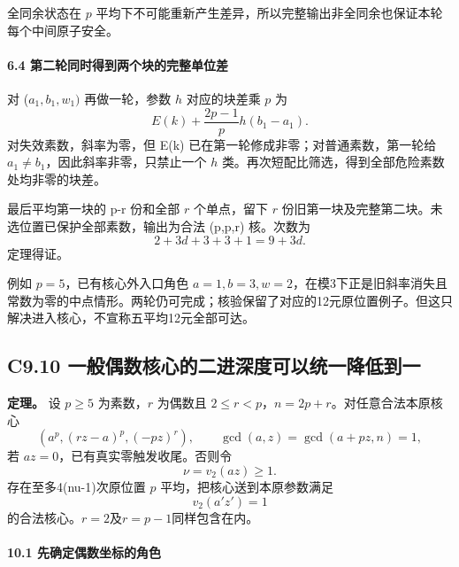 \documentclass[11pt,a4paper]{article}
\theoremstyle{definition}
\numberwithin{equation}{section}
\begin{document}
{全同余状态在} {\ensuremath{p}} {平均下不可能重新产生差异，所以完整输出非全同余也保证本轮每个中间原子安全。}

\paragraph*{\texorpdfstring{{6.4} {第二轮同时得到两个块的完整单位差}}{6.4 第二轮同时得到两个块的完整单位差}}\label{C9-h69}

{对} {(\ensuremath{a_{1},b_{1},w_{1})}} {再做一轮，参数} {\ensuremath{h}} {对应的块差乘} {\ensuremath{p}} {为} \[
E(k)+\frac{2p-1}{p}h(b_1-a_1).
\tag{C9.17}
\] {对失效素数，斜率为零，但} {E(k)} {已在第一轮修成非零；对普通素数，第一轮给} {\ensuremath{a_{1}\ne b_{1}}，因此斜率非零，只禁止一个} {\ensuremath{h}} {类。再次短配比筛选，得到全部危险素数处均非零的块差。}

{最后平均第一块的} {p-r} {份和全部} {\ensuremath{r}} {个单点，留下} {\ensuremath{r}} {份旧第一块及完整第二块。未选位置已保护全部素数，输出为合法} {(p,p,r)} {核。次数为} \[
2+3d+3+3+1=9+3d.
\] {定理得证。}

{例如} {\ensuremath{p=5}，已有核心外入口角色} {\ensuremath{a=1,b=3,w=2}，在模3下正是旧斜率消失且常数为零的中点情形。两轮仍可完成；核验保留了对应的12元原位置例子。但这只解决进入核心，不宣称五平均12元全部可达。}

\subsection*{\texorpdfstring{{C9.10} {一般偶数核心的二进深度可以统一降低到一}}{C9.10 一般偶数核心的二进深度可以统一降低到一}}\label{C9-h70}

\textbf{{定理。}} {设} {\ensuremath{p\ge 5}} {为素数，\ensuremath{r}} {为偶数且} {\ensuremath{2\le r<p}，\ensuremath{n=2p+r}。对任意合法本原核心} \[
(a^p,(rz-a)^p,(-pz)^r),\qquad
\gcd(a,z)=\gcd(a+pz,n)=1,
\] {若} {\ensuremath{az=0}，已有真实零触发收尾。否则令} \[
\nu=v_2(az)\ge1.
\] {存在至多4(nu-1)次原位置} {\ensuremath{p}} {平均，把核心送到本原参数满足} \[
\boxed{v_2(a'z')=1}
\tag{C9.19}
\] {的合法核心。\ensuremath{r=2}及\ensuremath{r=p-1}同样包含在内。}

\paragraph*{\texorpdfstring{{10.1} {先确定偶数坐标的角色}}{10.1 先确定偶数坐标的角色}}\label{C9-h71}
\end{document}
